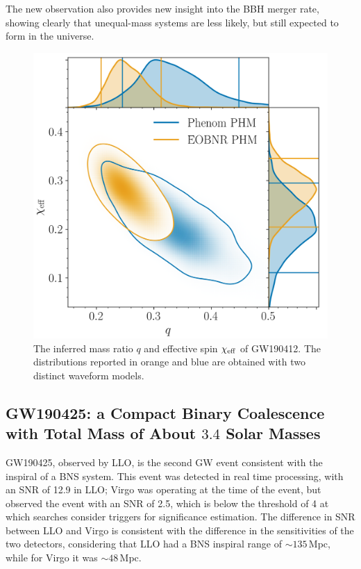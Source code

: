 \documentclass[binding=0.6cm, LaM]{sapthesis}
\begin{document}
	The new observation also provides new insight into the BBH merger rate, 
	showing clearly that unequal-mass systems are less likely, but still expected to form in the universe. \cite{133}

        \begin{figure}[!t]
          \label{asymmetric}
          \includegraphics[scale=0.2]{asymmetric}
          \centering
          \caption{The inferred mass ratio $q$ and effective spin $\chi_{\rm eff}$ of GW190412. The distributions reported in orange and blue are obtained with two distinct waveform models. \cite{133}} 
          \label{fig:asymmetric}
        \end{figure}

\subsection{GW190425: a Compact Binary Coalescence with Total Mass of About $3.4$ Solar Masses}
\label{subsec:GW190425}

	GW190425, observed by LLO, is the second GW event
	consistent with the inspiral of a BNS system.
	This event was detected in real time processing, with an SNR of 12.9 in LLO; 
	Virgo was operating at the time of the event, but observed the event with an SNR of 2.5, 
	which is below the threshold of 4 at which searches consider triggers for significance estimation. 
	The difference in SNR between LLO and Virgo is consistent with the difference 
	in the sensitivities of the two detectors, considering that LLO had 
	a BNS inspiral range of $\sim 135\,$Mpc, while for Virgo it was $\sim 48\,$Mpc.
\end{document}

